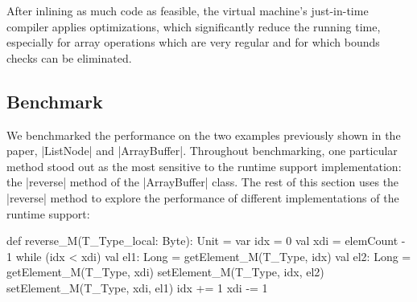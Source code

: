 After inlining as much code as feasible, the virtual machine's just-in-time compiler applies optimizations, which significantly reduce the running time, especially for array operations which are very regular and for which bounds checks can be eliminated.
\subsection{Benchmark}
\label{mbox:subsec-mb-bench}

We benchmarked the performance on the two examples previously shown in the paper, |ListNode| and |ArrayBuffer|. Throughout benchmarking, one particular method stood out as the most sensitive to the runtime support implementation: the |reverse| method of the |ArrayBuffer| class. The rest of this section uses the |reverse| method to explore the performance of different implementations of the runtime support:   

\begin{lstlisting-nobreak}
 def reverse_M(T_Type_local: Byte): Unit = {
   var idx = 0
   val xdi = elemCount - 1
   while (idx < xdi) {
     val el1: Long = getElement_M(T_Type, idx)
     val el2: Long = getElement_M(T_Type, xdi)
     setElement_M(T_Type, idx, el2)
     setElement_M(T_Type, xdi, el1)
     idx += 1
     xdi -= 1
   }
 }
\end{lstlisting-nobreak}

\newcommand{\optpm}[1]{}

